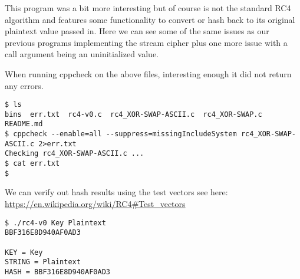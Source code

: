 \begin{Shaded}
\begin{Highlighting}[]
\NormalTok{:}
 
     \NormalTok{(}\NormalTok{) * strlen(argv[}\NormalTok{]));}
\NormalTok{    \textasciitilde{}\textasciitilde{}\textasciitilde{}\textasciitilde{}\textasciitilde{}\textasciitilde{}\textasciitilde{}\textasciitilde{}\textasciitilde{}\textasciitilde{}\textasciitilde{}\textasciitilde{}\textasciitilde{}\textasciitilde{}\textasciitilde{}             \^{}\textasciitilde{}\textasciitilde{}\textasciitilde{}\textasciitilde{}\textasciitilde{} \textasciitilde{}\textasciitilde{}\textasciitilde{}\textasciitilde{}\textasciitilde{}\textasciitilde{}\textasciitilde{}\textasciitilde{}\textasciitilde{}\textasciitilde{}\textasciitilde{}}
\end{Highlighting}
\end{Shaded}

This program was a bit more interesting but of course is not the
standard RC4 algorithm and features some functionality to convert or
hash back to its original plaintext value passed in. Here we can see
some of the same issues as our previous programs implementing the stream
cipher plus one more issue with a call argument being an uninitialized
value.

When running cppcheck on the above files, interesting enough it did not
return any errors.

\begin{verbatim}
$ ls
bins  err.txt  rc4-v0.c  rc4_XOR-SWAP-ASCII.c  rc4_XOR-SWAP.c  README.md
$ cppcheck --enable=all --suppress=missingIncludeSystem rc4_XOR-SWAP-ASCII.c 2>err.txt
Checking rc4_XOR-SWAP-ASCII.c ...
$ cat err.txt
$ 
\end{verbatim}

We can verify out hash results using the test vectors see here:
\href{https://en.wikipedia.org/wiki/RC4\#Test_vectors}{https://en.wikipedia.org/wiki/RC4\#Test\_vectors}

\begin{verbatim}
$ ./rc4-v0 Key Plaintext
BBF316E8D940AF0AD3

KEY = Key
STRING = Plaintext
HASH = BBF316E8D940AF0AD3
\end{verbatim}

